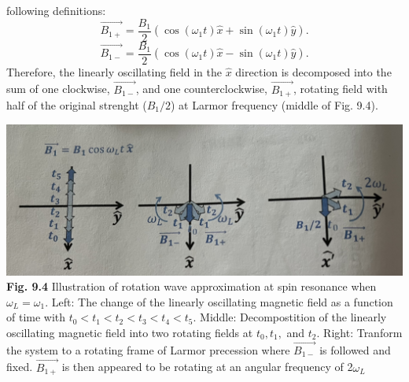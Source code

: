 \documentclass{article}
\begin{document}
following definitions:
\begin{equation}\label{eq 9.37}
    \vec{B_{1+}}=\frac{B_1}{2}(\cos(\omega_1t)\hat{x}+\sin(\omega_1t)\hat{y}).\tag{9.37}
\end{equation}
\begin{equation}\label{eq 9.38}
    \vec{B_{1-}}=\frac{B_1}{2}(\cos(\omega_1t)\hat{x}-\sin(\omega_1t)\hat{y}).\tag{9.38}
\end{equation}
Therefore, the linearly oscillating field in the $\hat{x}$ direction is decomposed into the
sum of one clockwise, $\vec{B_{1-}}$, and one counterclockwise, $\vec{B_{1+}}$, rotating field with
half of the original strenght ($B_1/2$) at Larmor frequency (middle of Fig. 9.4).

\includegraphics[scale=0.4]{Fig.9.4.jpeg}\\
\textbf{Fig. 9.4} Illustration of rotation wave approximation at spin resonance when $\omega_L=\omega_1$.
Left: The change of the linearly oscillating magnetic field as a function of time with $t_0<t_1<t_2<t_3<t_4<t_5$.
Middle: Decompostition of the linearly oscillating magnetic field into two rotating fields at 
$t_0, t_1,$ and $t_2$. Right: Tranform the system to a rotating frame of Larmor precession where 
$\vec{B_{1-}}$ is followed and fixed. $\vec{B_{1+}}$ is then appeared to be rotating at an angular frequency of 2$\omega_L$ \\\\
\end{document}
